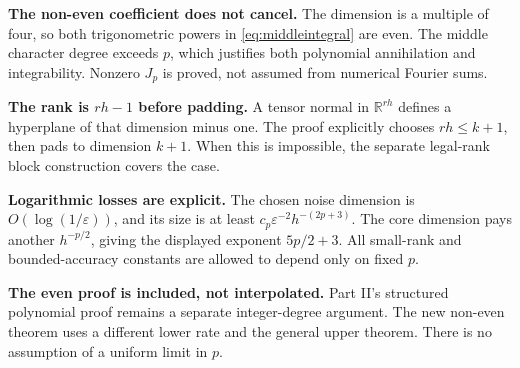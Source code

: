 \documentclass[11pt]{article}
\theoremstyle{remark}\newtheorem{remark}[theorem]{Remark}
\newcommand{\R}{\mathbb R}\newcommand{\E}{\mathbb E}\newcommand{\Prob}{\mathbb P}
\newcommand{\eps}{\varepsilon}\newcommand{\norm}[1]{\left\|#1\right\|}
\begin{document}
\textbf{The non-even coefficient does not cancel.}
The dimension is a multiple of four, so both trigonometric powers in \eqref{eq:middleintegral} are even. The middle character degree exceeds $p$, which justifies both polynomial annihilation and integrability. Nonzero $J_p$ is proved, not assumed from numerical Fourier sums.

\textbf{The rank is $rh-1$ before padding.}
A tensor normal in $\R^{rh}$ defines a hyperplane of that dimension minus one. The proof explicitly chooses $rh\le k+1$, then pads to dimension $k+1$. When this is impossible, the separate legal-rank block construction covers the case.

\textbf{Logarithmic losses are explicit.}
The chosen noise dimension is $O(\log(1/\eps))$, and its size is at least $c_p\eps^{-2}h^{-(2p+3)}$. The core dimension pays another $h^{-p/2}$, giving the displayed exponent $5p/2+3$. All small-rank and bounded-accuracy constants are allowed to depend only on fixed $p$.

\textbf{The even proof is included, not interpolated.}
Part II's structured polynomial proof remains a separate integer-degree argument. The new non-even theorem uses a different lower rate and the general upper theorem. There is no assumption of a uniform limit in $p$.
\end{document}
